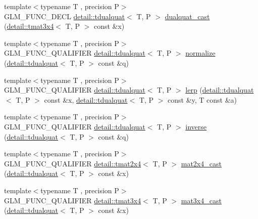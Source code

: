 \begin{DoxyCompactItemize}
\item 
{\footnotesize template$<$typename T , precision P$>$ }\\G\+L\+M\+\_\+\+F\+U\+N\+C\+\_\+\+D\+E\+CL \hyperlink{structglm_1_1detail_1_1tdualquat}{detail\+::tdualquat}$<$ T, P $>$ \hyperlink{group__gtc__dual__quaternion_ga97c4fb8941ad1954e01578cca8182180}{dualquat\+\_\+cast} (\hyperlink{structglm_1_1detail_1_1tmat3x4}{detail\+::tmat3x4}$<$ T, P $>$ const \&x)
\item 
{\footnotesize template$<$typename T , precision P$>$ }\\G\+L\+M\+\_\+\+F\+U\+N\+C\+\_\+\+Q\+U\+A\+L\+I\+F\+I\+ER \hyperlink{structglm_1_1detail_1_1tdualquat}{detail\+::tdualquat}$<$ T, P $>$ \hyperlink{group__gtc__dual__quaternion_ga4364d115fe8ee2f65ff047726133d0ad}{normalize} (\hyperlink{structglm_1_1detail_1_1tdualquat}{detail\+::tdualquat}$<$ T, P $>$ const \&q)
\item 
{\footnotesize template$<$typename T , precision P$>$ }\\G\+L\+M\+\_\+\+F\+U\+N\+C\+\_\+\+Q\+U\+A\+L\+I\+F\+I\+ER \hyperlink{structglm_1_1detail_1_1tdualquat}{detail\+::tdualquat}$<$ T, P $>$ \hyperlink{group__gtc__dual__quaternion_ga28cbcf029272d5351d4695b8610de126}{lerp} (\hyperlink{structglm_1_1detail_1_1tdualquat}{detail\+::tdualquat}$<$ T, P $>$ const \&x, \hyperlink{structglm_1_1detail_1_1tdualquat}{detail\+::tdualquat}$<$ T, P $>$ const \&y, T const \&a)
\item 
{\footnotesize template$<$typename T , precision P$>$ }\\G\+L\+M\+\_\+\+F\+U\+N\+C\+\_\+\+Q\+U\+A\+L\+I\+F\+I\+ER \hyperlink{structglm_1_1detail_1_1tdualquat}{detail\+::tdualquat}$<$ T, P $>$ \hyperlink{group__gtc__dual__quaternion_gaad6b9faeb1134c04defae01426a777f8}{inverse} (\hyperlink{structglm_1_1detail_1_1tdualquat}{detail\+::tdualquat}$<$ T, P $>$ const \&q)
\item 
{\footnotesize template$<$typename T , precision P$>$ }\\G\+L\+M\+\_\+\+F\+U\+N\+C\+\_\+\+Q\+U\+A\+L\+I\+F\+I\+ER \hyperlink{structglm_1_1detail_1_1tmat2x4}{detail\+::tmat2x4}$<$ T, P $>$ \hyperlink{group__gtc__dual__quaternion_gade155fb0dfc144259a25897776e73325}{mat2x4\+\_\+cast} (\hyperlink{structglm_1_1detail_1_1tdualquat}{detail\+::tdualquat}$<$ T, P $>$ const \&x)
\item 
{\footnotesize template$<$typename T , precision P$>$ }\\G\+L\+M\+\_\+\+F\+U\+N\+C\+\_\+\+Q\+U\+A\+L\+I\+F\+I\+ER \hyperlink{structglm_1_1detail_1_1tmat3x4}{detail\+::tmat3x4}$<$ T, P $>$ \hyperlink{group__gtc__dual__quaternion_ga2f4f0a1275fa95c272dd6ad6df75013d}{mat3x4\+\_\+cast} (\hyperlink{structglm_1_1detail_1_1tdualquat}{detail\+::tdualquat}$<$ T, P $>$ const \&x)

\end{DoxyCompactItemize}
